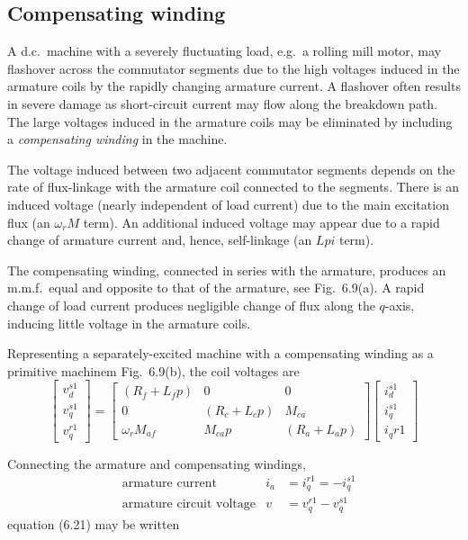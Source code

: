 \documentclass[a4paper,numbers=noenddot,12pt]{scrbook}
\begin{document}
\subsection{Compensating winding}
A d.c.\ machine with a severely fluctuating load, e.g.\ a rolling mill motor, may flashover across the commutator segments due to the high voltages induced in the armature coils by the rapidly changing armature current. A flashover often results in severe damage as short-circuit current may flow along the breakdown path. The large voltages induced in the armature coils may be eliminated by including a \textit{compensating winding} in the machine.

The voltage induced between two adjacent commutator segments depends on the rate of flux-linkage with the armature coil connected to the segments. There is an induced voltage (nearly independent of load current) due to the main excitation flux (an $\omega_r M$ term). An additional induced voltage may appear due to a rapid change of armature current and, hence, self-linkage (an $L p i$ term).

The compensating winding, connected in series with the armature, produces an m.m.f.\ equal and opposite to that of the armature, see Fig.\ 6.9(a). A rapid change of load current produces negligible change of flux along the $q$-axis, inducing little voltage in the armature coils.

Representing a separately-excited machine with a compensating winding as a primitive machinem Fig.\ 6.9(b), the coil voltages are
\begin{equation}
    \begin{bmatrix}
        v_d^{s1} \\[2ex] v_q^{s1} \\[2ex] v_q^{r1}
    \end{bmatrix} = 
    \begin{bmatrix}
        (R_f + L_f p) & 0 & 0 \\[2ex]
        0 & (R_c + L_c p) & M_{ca} \\[2ex]
        \omega_r M_{af} & M_{ca} p & (R_a + L_a p)
    \end{bmatrix}
    \begin{bmatrix}
        i_d^{s1} \\[2ex] i_q^{s1} \\[2ex] i_q{r1}
    \end{bmatrix}
    \label{}
\end{equation}

Connecting the armature and compensating windings,
\begin{align*}
    &\text{armature current}  & i_a & = i_q^{r1} = -i_q^{s1} \\
    &\text{armature circuit voltage} & v & = v_q^{r1} - v_q^{s1}
    \label{}
\end{align*}
equation (6.21) may be written
\end{document}
